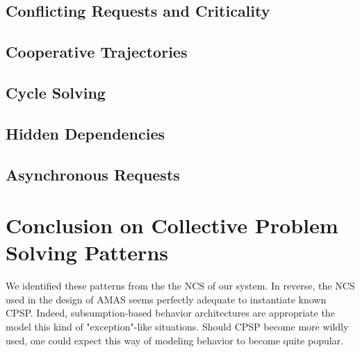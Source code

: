 \subsection{Conflicting Requests and Criticality}

\subsection{Cooperative Trajectories}

\subsection{Cycle Solving}

\subsection{Hidden Dependencies}

\subsection{Asynchronous Requests}

\section{Conclusion on Collective Problem Solving Patterns}
We identified these patterns from the the NCS of our system. In reverse, the NCS used in the design of AMAS seems perfectly adequate to instantiate known CPSP. Indeed, subsumption-based behavior architectures are appropriate the model this kind of "exception"-like situations. Should CPSP become more wildly used, one could expect this way of modeling behavior to become quite popular.